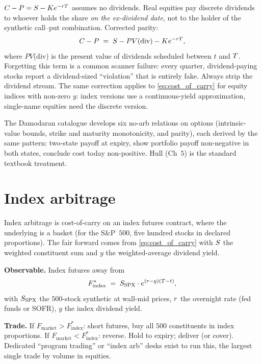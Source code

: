 \begin{pitfallbox}
\label{pf:parity_dividends}
$C - P = S - K e^{-r T}$ assumes no
dividends. Real equities pay discrete dividends to whoever
holds the share \emph{on the ex-dividend date}, not to the
holder of the synthetic call--put combination. Corrected
parity:
\begin{equation*}
  C - P \;=\; S - PV(\text{div}) - K e^{-r T},
\end{equation*}
where $PV$(div) is the present value of dividends scheduled
between $t$ and $T$. Forgetting this term is a common
scanner failure: every quarter, dividend-paying stocks report a
dividend-sized ``violation'' that is entirely fake. Always strip
the dividend stream. The same correction applies to
\eqref{eq:cost_of_carry} for equity indices with non-zero
$y$: index versions use a continuous-yield approximation,
single-name equities need the discrete version.
\end{pitfallbox}

The Damodaran catalogue \citep{damodaranOptionsArbitrage}
develops six no-arb relations on options (intrinsic-value
bounds, strike and maturity monotonicity, and parity), each
derived by the same pattern: two-state payoff at expiry, show
portfolio payoff non-negative in both states, conclude cost
today non-positive. Hull \citeHull{} (Ch~$5$) is the standard
textbook treatment.

\section{Index arbitrage}
\label{sec:ch13_index}

Index arbitrage is cost-of-carry on an index futures contract,
where the underlying is a basket (for the S\&P~$500$, five
hundred stocks in declared proportions). The fair forward comes
from \eqref{eq:cost_of_carry} with $S$ the weighted
constituent sum and $y$ the weighted-average dividend yield.

\textbf{Observable.} Index futures away from
\begin{equation*}
  F^*_{\text{index}} \;=\; S_{\text{SPX}} \cdot e^{(r - y)(T - t)},
\end{equation*}
with $S_{\text{SPX}}$ the $500$-stock synthetic at wall-mid
prices, $r$ the overnight rate (fed funds or SOFR), $y$ the
index dividend yield.

\textbf{Trade.} If $F_{\text{market}} > F^*_{\text{index}}$:
short futures, buy all $500$ constituents in index proportions.
If $F_{\text{market}} < F^*_{\text{index}}$: reverse. Hold to
expiry; deliver (or cover). Dedicated ``program trading'' or
``index arb'' desks exist to run this, the largest single
trade by volume in equities.


